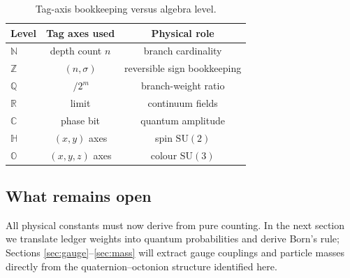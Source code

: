 \begin{table}[b]
  \centering
  \begin{tabular}{lcc}
    \hline
    Level & Tag axes used & Physical role \\
    \hline
    $\mathbb N$ & depth count $n$ & branch cardinality \\[2pt]
    $\mathbb Z$ & $(n,\sigma)$ & reversible sign bookkeeping \\[2pt]
    $\mathbb Q$ & $\,/2^m$ & branch-weight ratio \\[2pt]
    $\mathbb R$ & limit & continuum fields \\[2pt]
    $\mathbb C$ & phase bit & quantum amplitude \\[2pt]
    $\mathbb H$ & $(x,y)$ axes & spin $\mathrm{SU}(2)$ \\[2pt]
    $\mathbb O$ & $(x,y,z)$ axes & colour $\mathrm{SU}(3)$ \\
    \hline
  \end{tabular}
  \caption{Tag-axis bookkeeping versus algebra level.}
  \label{tab:number-levels}
\end{table}

\subsection{What remains open}

All physical constants must now derive from pure counting.  In the next
section we translate ledger weights into quantum probabilities and derive
Born's rule; Sections \ref{sec:gauge}–\ref{sec:mass} will extract gauge
couplings and particle masses directly from the quaternion–octonion
structure identified here.

\clearpage
